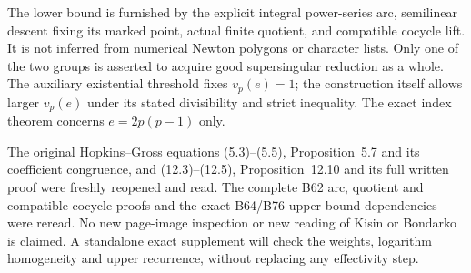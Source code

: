 \begin{remark}
\label{rem:B-RD100-scope}
The lower bound is furnished by the explicit integral
power-series arc, semilinear descent fixing its marked
point, actual finite quotient, and compatible cocycle lift.
It is not inferred from numerical Newton polygons or
character lists. Only one of the two groups is asserted
to acquire good supersingular reduction as a whole.
The auxiliary existential threshold fixes $v_p(e)=1$;
the construction itself allows larger $v_p(e)$ under
its stated divisibility and strict inequality.
The exact index theorem concerns $e=2p(p-1)$ only.

The original Hopkins--Gross equations (5.3)--(5.5),
Proposition~5.7 and its coefficient congruence, and
(12.3)--(12.5), Proposition~12.10 and its full written
proof were freshly reopened and read. The complete B62
arc, quotient and compatible-cocycle proofs and the exact
B64/B76 upper-bound dependencies were reread.
No new page-image inspection or new reading of Kisin
or Bondarko is claimed. A standalone exact supplement
will check the weights, logarithm homogeneity and
upper recurrence, without replacing any effectivity step.
\end{remark}
